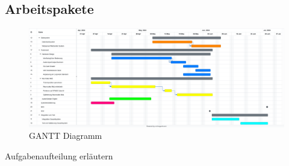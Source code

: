 \subsection{Arbeitspakete}

    \begin{figure}[H]
	\centering
	\includegraphics[width=1.0\textwidth]{images/04_spezifikation/gantt.png}
	\caption{GANTT Diagramm}
	\label{fig:gantt}
\end{figure}


Aufgabenaufteilung erläutern